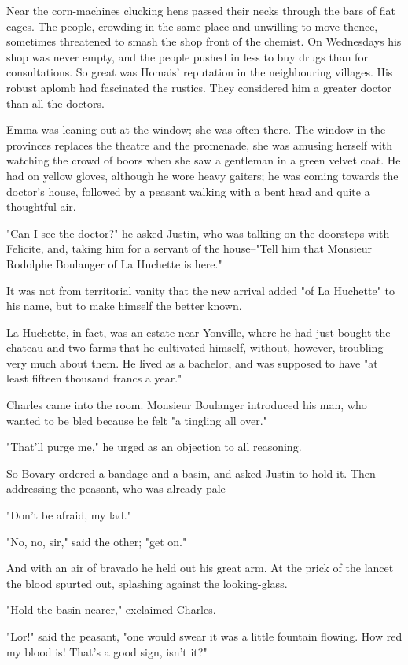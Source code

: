\documentclass[11pt,twocolumn]{ltugboat}
\begin{document}
Near the corn-machines clucking hens passed their necks through the bars
of flat cages. The people, crowding in the same place and unwilling
to move thence, sometimes threatened to smash the shop front of the
chemist. On Wednesdays his shop was never empty, and the people pushed
in less to buy drugs than for consultations. So great was Homais'
reputation in the neighbouring villages. His robust aplomb had
fascinated the rustics. They considered him a greater doctor than all
the doctors.

Emma was leaning out at the window; she was often there. The window in
the provinces replaces the theatre and the promenade, she was amusing
herself with watching the crowd of boors when she saw a gentleman in
a green velvet coat. He had on yellow gloves, although he wore heavy
gaiters; he was coming towards the doctor's house, followed by a peasant
walking with a bent head and quite a thoughtful air.

"Can I see the doctor?" he asked Justin, who was talking on the
doorsteps with Felicite, and, taking him for a servant of the
house--"Tell him that Monsieur Rodolphe Boulanger of La Huchette is
here."

It was not from territorial vanity that the new arrival added "of La
Huchette" to his name, but to make himself the better known.

La Huchette, in fact, was an estate near Yonville, where he had just
bought the chateau and two farms that he cultivated himself, without,
however, troubling very much about them. He lived as a bachelor, and was
supposed to have "at least fifteen thousand francs a year."

Charles came into the room. Monsieur Boulanger introduced his man, who
wanted to be bled because he felt "a tingling all over."

"That'll purge me," he urged as an objection to all reasoning.

So Bovary ordered a bandage and a basin, and asked Justin to hold it.
Then addressing the peasant, who was already pale--

"Don't be afraid, my lad."

"No, no, sir," said the other; "get on."

And with an air of bravado he held out his great arm. At the prick of
the lancet the blood spurted out, splashing against the looking-glass.

"Hold the basin nearer," exclaimed Charles.

"Lor!" said the peasant, "one would swear it was a little fountain
flowing. How red my blood is! That's a good sign, isn't it?"
\end{document}
